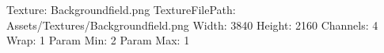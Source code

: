 Texture: Backgroundfield.png
TextureFilePath: Assets/Textures/Backgroundfield.png
Width: 3840
Height: 2160
Channels: 4
Wrap: 1
Param Min: 2
Param Max: 1